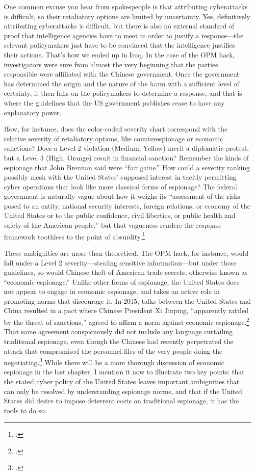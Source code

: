 \documentclass{report}
\begin{document}
\begin{refsegment}
One common excuse you hear from spokespeople is that attributing cyberattacks is difficult, so their retaliatory options are limited by uncertainty. Yes, definitively attributing cyberattacks is difficult, but there is also no external standard of proof that intelligence agencies have to meet in order to justify a response---the relevant policymakers just have to be convinced that the intelligence justifies their actions. That's how we ended up in Iraq. In the case of the OPM hack, investigators were sure from almost the very beginning that the parties responsible were affiliated with the Chinese government. Once the government has determined the origin and the nature of the harm with a sufficient level of certainty, it then falls on the policymakers to determine a response, and that is where the guidelines that the US government publishes cease to have any explanatory power.

How, for instance, does the color-coded severity chart correspond with the relative severity of retaliatory options, like counterespionage or economic sanctions? Does a Level 2 violation (Medium, Yellow) merit a diplomatic protest, but a Level 3 (High, Orange) result in financial sanction? Remember the kinds of espionage that John Brennan said were ``fair game.'' How could a severity ranking possibly mesh with the United States' supposed interest in tacitly permitting cyber operations that look like more classical forms of espionage? The federal government is naturally vague about how it weighs its ``assessment of the risks posed to an entity, national security interests, foreign relations, or economy of the United States or to the public confidence, civil liberties, or public health and safety of the American people,'' but that vagueness renders the response framework toothless to the point of absurdity.\footcite{office_of_the_press_secretary_fact_2016}

These ambiguities are more than theoretical. The OPM hack, for instance, would fall under a Level 2 severity---stealing sensitive information---but under those guidelines, so would Chinese theft of American trade secrets, otherwise known as ``economic espionage.'' Unlike other forms of espionage, the United States does not appear to engage in economic espionage, and takes an active role in promoting norms that discourage it. In 2015, talks between the United States and China resulted in a pact where Chinese President Xi Jinping, ``apparently rattled by the threat of sanctions,'' agreed to affirm a norm against economic espionage.\footcite{nakashima_u.s._2015} That same agreement conspicuously did not include any language curtailing traditional espionage, even though the Chinese had recently perpetrated the attack that compromised the personnel files of the very people doing the negotiating.\footcite{nakashima_u.s._2015} While there will be a more thorough discussion of economic espionage in the last chapter, I mention it now to illustrate two key points: that the stated cyber policy of the United States leaves important ambiguities that can only be resolved by understanding espionage norms, and that if the United States did desire to impose deterrent costs on traditional espionage, it has the tools to do so.


\end{refsegment}
\end{document}
